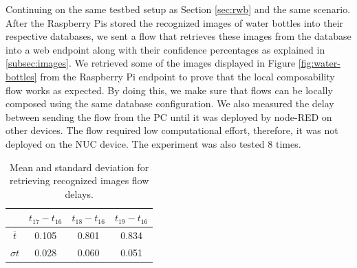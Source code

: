  \noindent Continuing on the same testbed setup as Section \ref{sec:rwb} and the same scenario.  After the Raspberry Pis stored the recognized images of water bottles into their respective  databases, we sent a flow that retrieves these images from the database into a web endpoint along with their confidence percentages as explained in \ref{subsec:images}.  We retrieved some of the images displayed in  Figure \ref{fig:water-bottles} from the  Raspberry Pi endpoint to prove that the local composability flow works as expected. By doing this, we make sure that flows can be locally composed using the same database configuration. We also measured the delay between sending the flow from the PC until it was deployed by node-RED on other devices. The flow required low computational effort, therefore, it was not  deployed on the NUC device. The experiment was also tested 8 times.

\begin{table}[H]
	\centering
	\begin{tabular}{ c | c | c| c }	\toprule
		&$t_{17} - t_{16}$  & $t_{18} - t_{16}$  & $t_{19}-t_{16}$ \\ \midrule
		$ \overline{t} $&	0.105&	0.801&	0.834\\
		$ \sigma t $&	0.028&	0.060&	0.051\\
	\end{tabular}
	\caption{Mean and standard deviation for retrieving recognized images flow delays.}
	\label{table:images}
\end{table}


